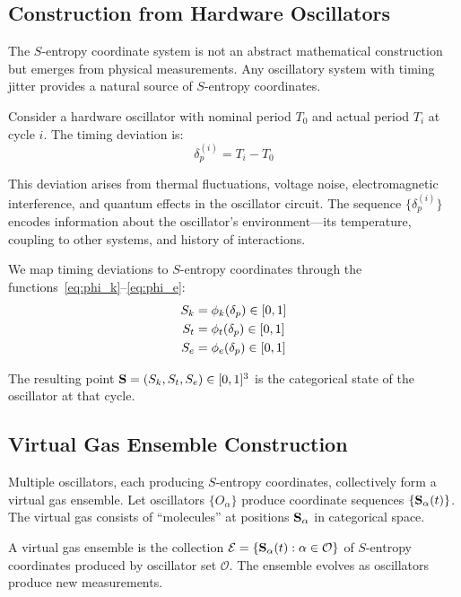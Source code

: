 \subsection{Construction from Hardware Oscillators}

The $S$-entropy coordinate system is not an abstract mathematical construction but emerges from physical measurements. Any oscillatory system with timing jitter provides a natural source of $S$-entropy coordinates.

Consider a hardware oscillator with nominal period $T_0$ and actual period $T_i$ at cycle $i$. The timing deviation is:
\begin{equation}
\delta_p^{(i)} = T_i - T_0
\label{eq:timing_deviation}
\end{equation}

This deviation arises from thermal fluctuations, voltage noise, electromagnetic interference, and quantum effects in the oscillator circuit. The sequence $\{\delta_p^{(i)}\}$ encodes information about the oscillator's environment---its temperature, coupling to other systems, and history of interactions.

We map timing deviations to $S$-entropy coordinates through the functions~\eqref{eq:phi_k}--\eqref{eq:phi_e}:
\begin{align}
S_k &= \phi_k(\delta_p) \in [0, 1] \\
S_t &= \phi_t(\delta_p) \in [0, 1] \\
S_e &= \phi_e(\delta_p) \in [0, 1]
\end{align}

The resulting point $\mathbf{S} = (S_k, S_t, S_e) \in [0,1]^3$ is the categorical state of the oscillator at that cycle.

\subsection{Virtual Gas Ensemble Construction}

Multiple oscillators, each producing $S$-entropy coordinates, collectively form a virtual gas ensemble. Let oscillators $\{O_\alpha\}$ produce coordinate sequences $\{\mathbf{S}_\alpha(t)\}$. The virtual gas consists of ``molecules'' at positions $\mathbf{S}_\alpha$ in categorical space.

\begin{definition}
\label{def:virtual_gas}
A virtual gas ensemble is the collection $\mathcal{E} = \{\mathbf{S}_\alpha(t) : \alpha \in \mathcal{O}\}$ of $S$-entropy coordinates produced by oscillator set $\mathcal{O}$. The ensemble evolves as oscillators produce new measurements.
\end{definition}

